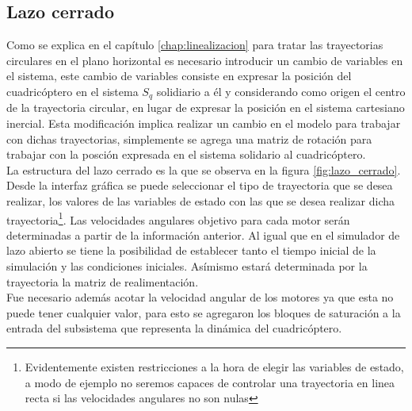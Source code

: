 \documentclass[main]{subfiles}
\begin{document}
\subsection{Lazo cerrado}

Como se explica en el cap\'itulo \ref{chap:linealizacion} para tratar las trayectorias circulares en el plano horizontal es necesario introducir un cambio de variables en el sistema, este cambio de variables consiste en expresar la posici\'on del cuadric\'optero en el sistema $S_q$ solidiario a \'el y considerando como origen el centro de la trayectoria circular, en lugar de expresar la posici\'on en el sistema cartesiano inercial. Esta modificaci\'on implica realizar un cambio en el modelo para trabajar con dichas trayectorias, simplemente se agrega una matriz de rotaci\'on para trabajar con la posci\'on expresada en el sistema solidario al cuadric\'optero.\\ 

La estructura del lazo cerrado es la que se observa en la figura \ref{fig:lazo_cerrado}. Desde la interfaz gr\'afica se puede seleccionar el tipo de trayectoria que se desea realizar, los valores de las variables de estado con las que se desea realizar dicha trayectoria\footnote{Evidentemente existen restricciones a la hora de elegir las variables de estado, a modo de ejemplo no seremos capaces de controlar una trayectoria en linea recta si las velocidades angulares no son nulas}. Las velocidades angulares objetivo para cada motor ser\'an determinadas a partir de la informaci\'on anterior. Al igual que en el simulador de lazo abierto se tiene la posibilidad de establecer tanto el tiempo inicial de la simulaci\'on y las condiciones iniciales. As\'imismo estar\'a determinada por la trayectoria la matriz de realimentaci\'on.\\

Fue necesario adem\'as acotar la velocidad angular de los motores ya que esta no puede tener cualquier valor, para esto se agregaron los bloques de saturaci\'on a la entrada del subsistema que representa la din\'amica del cuadric\'optero.\\
\end{document}
